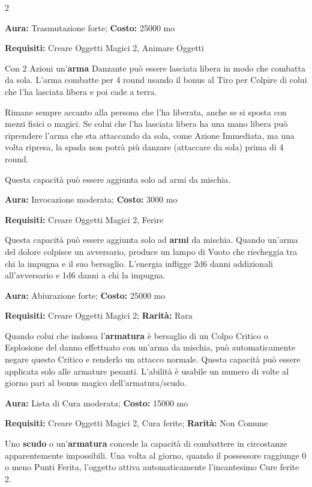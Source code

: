 \begin{multicols}{2}

\textbf{Aura:} Trasmutazione forte; \textbf{Costo:} 25000 mo

\textbf{Requisiti:} Creare Oggetti Magici 2, Animare Oggetti

Con 2 Azioni un'\textbf{arma} Danzante può essere lasciata libera in modo che combatta da sola. L'arma combatte per 4 round usando il bonus al Tiro per Colpire di colui che l'ha lasciata libera e poi cade a terra.

Rimane sempre accanto alla persona che l'ha liberata, anche se si sposta con mezzi fisici o magici. Se colui che l'ha lasciata libera ha una mano libera può riprendere l'arma che sta attaccando da sola, come Azione Immediata, ma una volta ripresa, la spada non potrà più danzare (attaccare da sola) prima di 4 round.

Questa capacità può essere aggiunta solo ad armi da mischia.


\textbf{Aura:} Invocazione moderata; \textbf{Costo:} 3000 mo

\textbf{Requisiti:} Creare Oggetti Magici 2, Ferire

Questa capacità può essere aggiunta solo ad \textbf{armi} da mischia. Quando un'arma del dolore colpisce un avversario, produce un lampo di Vuoto che riecheggia tra chi la impugna e il suo bersaglio. L'energia infligge 2d6 danni addizionali all'avversario e 1d6 danni a chi la impugna.


\textbf{Aura:} Abiurazione forte; \textbf{Costo:} 25000 mo

\textbf{Requisiti:} Creare Oggetti Magici 2; \textbf{Rarità:} Rara

Quando colui che indossa l'\textbf{armatura} è bersaglio di un Colpo Critico o Esplosione del danno effettuato con un'arma da mischia, può automaticamente negare questo Critico e renderlo un attacco normale. Questa capacità può essere applicata solo alle armature pesanti. L'abilità è usabile un numero di volte al giorno pari al bonus magico dell'armatura/scudo.


\textbf{Aura:} Lista di Cura moderata; \textbf{Costo:} 15000 mo

\textbf{Requisiti:} Creare Oggetti Magici 2, Cura ferite; \textbf{Rarità:} Non Comune

Uno \textbf{scudo} o un'\textbf{armatura} concede la capacità di combattere in circostanze apparentemente impossibili. Una volta al giorno, quando il possessore raggiunge 0 o meno Punti Ferita, l'oggetto attiva automaticamente l'incantesimo Cure ferite 2.


\end{multicols}

